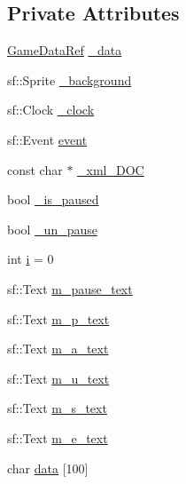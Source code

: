 \subsection*{Private Attributes}
\begin{DoxyCompactItemize}
\item 
\hyperlink{namespaceSekander_a1d69b002ba2d23020901c28f0def5e16}{Game\+Data\+Ref} \hyperlink{classSekander_1_1GameState_a8d4871b8f695026f712a631f4d15a7bc}{\+\_\+data}
\item 
sf\+::\+Sprite \hyperlink{classSekander_1_1GameState_ac757f96251226e5d5cd07b8c75671299}{\+\_\+background}
\item 
sf\+::\+Clock \hyperlink{classSekander_1_1GameState_a3ed5ec609d3994afe8b25a6b3359abb7}{\+\_\+clock}
\item 
sf\+::\+Event \hyperlink{classSekander_1_1GameState_a51627fd89906e418c311a4853e7509ed}{event}
\item 
const char $\ast$ \hyperlink{classSekander_1_1GameState_a664c380e695b82fb68aead1cd9828282}{\+\_\+xml\+\_\+\+D\+OC}
\item 
bool \hyperlink{classSekander_1_1GameState_a64afed7f84d58d0b0d52752b33969ba2}{\+\_\+is\+\_\+paused}
\item 
bool \hyperlink{classSekander_1_1GameState_ace01a1a5682f32d83ddc4308c2dd5a0a}{\+\_\+un\+\_\+pause}
\item 
int \hyperlink{classSekander_1_1GameState_a9017176374407458e6fe4b0369ae63ba}{i} = 0
\item 
sf\+::\+Text \hyperlink{classSekander_1_1GameState_a9e4007a56ece8fb04e344198f3f00681}{m\+\_\+pause\+\_\+text}
\item 
sf\+::\+Text \hyperlink{classSekander_1_1GameState_ab8a913dd7ad77c86fd2588ab3cea7a3d}{m\+\_\+p\+\_\+text}
\item 
sf\+::\+Text \hyperlink{classSekander_1_1GameState_a6eae10c82abd67f0c5f277d476040fa7}{m\+\_\+a\+\_\+text}
\item 
sf\+::\+Text \hyperlink{classSekander_1_1GameState_a4d4f6d805ef4f5964cfa985c9eb49863}{m\+\_\+u\+\_\+text}
\item 
sf\+::\+Text \hyperlink{classSekander_1_1GameState_a003a29119d0c6036f48f6629c310e982}{m\+\_\+s\+\_\+text}
\item 
sf\+::\+Text \hyperlink{classSekander_1_1GameState_a5e1efc74f4b4c89981980762f7746188}{m\+\_\+e\+\_\+text}
\item 
char \hyperlink{classSekander_1_1GameState_ab267d83dd406910063033004946c83e3}{data} \mbox{[}100\mbox{]}
\item 

\end{DoxyCompactItemize}
